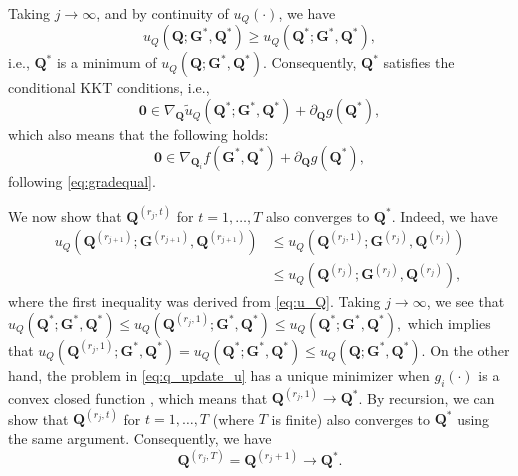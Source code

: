 \documentclass[10pt,journal]{IEEEtran}
\newcommand{\G}{\boldsymbol{G}}
\newcommand{\Q}{\boldsymbol{Q}}
\begin{document}
Taking $j\rightarrow \infty$, and by continuity of $u_Q(\cdot)$, we have
\begin{equation}
	    u_Q({\bm Q};{\bm G}^{\ast},{\bm Q}^\ast) \geq  u_Q({\bm Q}^\ast;{\bm G}^{\ast},{\bm Q}^\ast),
\end{equation}
i.e., ${\bm Q}^{\ast}$ is a minimum of $u_Q({\bm Q};{\bm G}^{\ast},{\bm Q}^\ast)$.
Consequently, ${\bm Q}^{\ast}$ satisfies the conditional KKT conditions, i.e.,
\begin{equation*}
	 {\bm 0} \in  \nabla_{{\bm Q}} \tilde{u}_Q({\bm Q}^\ast;{\bm G}^{\ast},{\bm Q}^\ast) + \partial_{\Q}g(\Q^\ast),
\end{equation*}
which also means that the following holds:
\begin{equation}\label{eq:QKKT}
	     {\bm 0} \in \nabla_{{\bm Q}_i} f({\bm G}^{\ast},{\bm Q}^\ast) + \partial_{\Q}g(\Q^\ast) ,
\end{equation}
following \eqref{eq:gradequal}.

We now show that $\Q^{(r_j,t)}$ for $t=1,\ldots,T$ also converges to $\Q^\ast$.
Indeed, we have
\begin{align*}
u_Q(\Q^{(r_{j+1})};\G^{(r_{j+1})},\Q^{(r_{j+1})})&\leq u_Q(\Q^{(r_j,1)};\G^{(r_j)},\Q^{(r_j)})\\
&\leq u_Q(\Q^{(r_j)};\G^{(r_j)},\Q^{(r_j)}) ,
\end{align*}
where the first inequality was derived from \eqref{eq:u_Q}.
Taking $j\rightarrow \infty$, we see that
$ u_Q(\Q^{\ast};\G^{\ast},\Q^{\ast})\leq u_Q(\Q^{(r_j,1)};\G^{\ast},\Q^{\ast})\leq u_Q(\Q^{\ast};\G^{\ast},\Q^{\ast}) , $
which implies that
$u_Q(\Q^{(r_j,1)};\G^{\ast},\Q^{\ast})= u_Q(\Q^{\ast};\G^{\ast},\Q^{\ast})\leq u_Q(\Q;\G^{\ast},\Q^{\ast}).$
On the other hand, the problem in \eqref{eq:q_update_u} has a unique minimizer when $g_i(\cdot)$ is a convex closed function \cite{parikh2013proximal},
which means that $\Q^{(r_j,1)}\rightarrow \Q^{\ast}$. By recursion, we can show that
$\Q^{(r_j,t)}$ for $t=1,\ldots,T$ (where $T$ is finite) also converges to $\Q^\ast$ using the same argument.
Consequently, we have
\begin{equation}\label{eq:q_rj+1}
\Q^{(r_j,T)} = \Q^{(r_j+1)} \rightarrow \Q^\ast. 
\end{equation}
\end{document}
